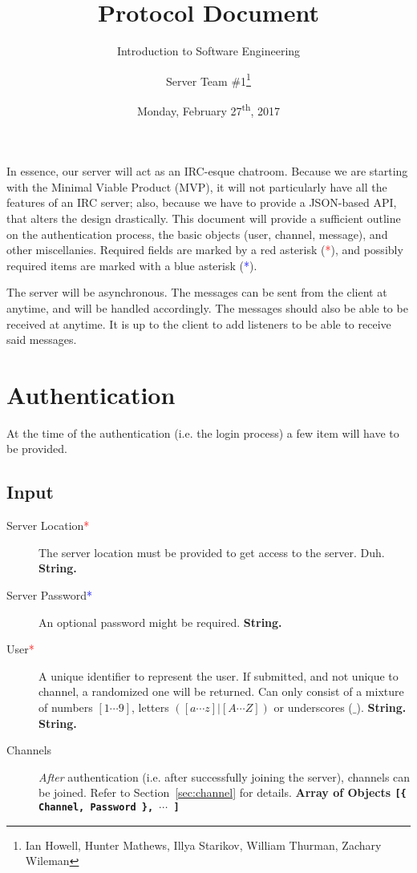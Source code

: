 \documentclass[12pt]{scrartcl}
\title{Protocol Document}
\subtitle{Introduction to Software Engineering}
\author{Server Team \#1\thanks{Ian Howell, Hunter Mathews, Illya Starikov, William Thurman, Zachary Wileman}}
\date{Monday, February 27\textsuperscript{th}, 2017}
\newcommand{\req}{\textcolor{red}{*}}
\newcommand{\reqalt}{\textcolor{blue}{*}}
\begin{document}
\maketitle

In essence, our server will act as an IRC-esque chatroom. Because we are starting with the Minimal Viable Product (MVP), it will not particularly have all the features of an IRC server; also, because we have to provide a JSON-based API, that alters the design drastically. This document will provide a sufficient outline on the authentication process, the basic objects (user, channel, message), and other miscellanies. Required fields are marked by a red asterisk (\req), and possibly required items are marked with a blue asterisk (\reqalt).

The server will be asynchronous. The messages can be sent from the client at anytime, and will be handled accordingly. The messages should also be able to be received at anytime. It is up to the client to add listeners to be able to receive said messages.


\section{Authentication}
At the time of the authentication (i.e. the login process) a few item will have to be provided.

\subsection{Input}
\begin{description}
    \item[Server Location\req] The server location must be provided to get access to the server. Duh. \textbf{String.}
    \item[Server Password\reqalt] An optional password might be required. \textbf{String.}
    \item[User\req] A unique identifier to represent the user. If submitted, and not unique to channel, a randomized one will be returned. Can only consist of a mixture of numbers $[1 \cdots 9]$, letters $([a \cdots z] | [A \cdots Z])$ or underscores ($\_$). \textbf{String.} \textbf{String.}
    \item[Channels] \textit{After} authentication (i.e. after successfully joining the server), channels can be joined. Refer to Section~\ref{sec:channel} for details. \textbf{Array of Objects \texttt{[\{ Channel, Password \}, $\cdots$ ]}}
\end{description}
\end{document}
